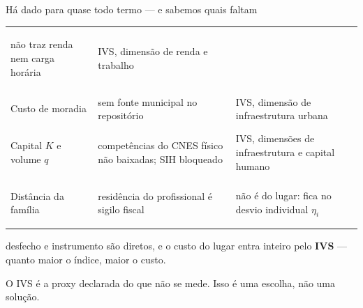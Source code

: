 \documentclass[aspectratio=169,10pt]{beamer}
\begin{document}
\begin{frame}{Há dado para quase todo termo --- e sabemos quais faltam}
{{\begin{tabularx}{\textwidth}{@{}>{\bfseries\raggedright\arraybackslash}p{} L >{\raggedright\arraybackslash}p{0.3\textwidth}@{}}
        não traz renda nem carga horária & IVS, dimensão de renda e trabalho \\
      Custo de moradia & sem fonte municipal no repositório & IVS, dimensão
        de infraestrutura urbana \\
      Capital $K$ e volume $q$ & competências do CNES físico não baixadas;
        SIH bloqueado & IVS, dimensões de infraestrutura e capital humano \\
      Distância da família & residência do profissional é sigilo fiscal &
        não é do lugar: fica no desvio individual $\eta_i$ \\
      \bottomrule
    \end{tabularx}}

    \vspace{0.15em}
    {\footnotesize {} desfecho e instrumento são
    diretos, e o custo do lugar entra inteiro pelo \textbf{IVS} --- quanto
    maior o índice, maior o custo.}

    \vspace{0.05em}
    \begin{destaque}[0.96\textwidth]
      \footnotesize O IVS é a proxy declarada do que não se mede. Isso é uma
      escolha, não uma solução.
    \end{destaque}
  }%

\end{frame}

%
\appendix
\pmmeapendice   %

\begin{frame}[plain]
\end{frame}
\end{document}

